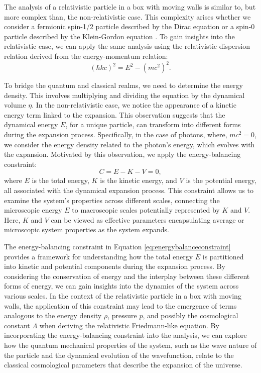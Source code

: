\documentclass{article}
\begin{document}
The analysis of a relativistic particle in a box with moving walls is similar to, but more complex than, the non-relativistic case. This complexity arises whether we consider a fermionic spin-1/2 particle described by the Dirac equation or a spin-0 particle described by the Klein-Gordon equation \cite{Koehn:2012red}. To gain insights into the relativistic case, we can apply the same analysis using the relativistic dispersion relation derived from the energy-momentum relation:
\begin{equation}
(\hbar kc)^2  = E^2 - (mc^2)^2. \label{eqRelDispersion}
\end{equation}

To bridge the quantum and classical realms, we need to determine the energy density. This involves multiplying and dividing the equation by the dynamical volume $\eta$. In the non-relativistic case, we notice the appearance of a kinetic energy term linked to the expansion. This observation suggests that the dynamical energy $E$, for a unique particle, can transform into different forms during the expansion process. Specifically, in the case of photons, where, $mc^2=0$, we consider the energy density related to the photon's energy, which evolves with the expansion. Motivated by this observation, we apply the energy-balancing constraint:
\begin{equation}
\ensuremath{C=E-K-V=0},\label{eq:energybalanceconstraint}
\end{equation}
where $E$ is the total energy, $K$ is the kinetic energy, and $V$ is the potential energy, all associated with the dynamical expansion process. This constraint allows us to examine the system's properties across different scales, connecting the microscopic energy $E$ to macroscopic scales potentially represented by $K$ and $V$. Here, $K$ and $V$ can be viewed as effective parameters encapsulating average or microscopic system properties as the system expands.


The energy-balancing constraint in Equation \ref{eq:energybalanceconstraint} provides a framework for understanding how the total energy $E$ is partitioned into kinetic and potential components during the expansion process. By considering the conservation of energy and the interplay between these different forms of energy, we can gain insights into the dynamics of the system across various scales.
In the context of the relativistic particle in a box with moving walls, the application of this constraint may lead to the emergence of terms analogous to the energy density $\rho$, pressure $p$, and possibly the cosmological constant $\Lambda$ when deriving the relativistic Friedmann-like equation. By incorporating the energy-balancing constraint into the analysis, we can explore how the quantum mechanical properties of the system, such as the wave nature of the particle and the dynamical evolution of the wavefunction, relate to the classical cosmological parameters that describe the expansion of the universe.
\end{document}

